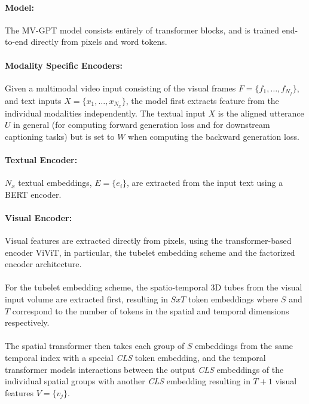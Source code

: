 \documentclass{article}
\begin{document}
\paragraph{Model:} The MV-GPT model consists entirely of transformer blocks, and is trained
end-to-end directly from pixels and word tokens.

\paragraph{Modality Specific Encoders:}Given a multimodal video input consisting of the visual frames $F = \{f_1, \ldots, f_{N_f}\}$,
and text inputs $X = \{x_1, \ldots, x_{N_x}\}$, the model first extracts feature from the individual
modalities independently. The textual input $X$ is the aligned utterance $U$ in general (for computing
forward generation loss and for downstream captioning tasks) but is set to $W$ when computing the
backward generation loss.
\paragraph{Textual Encoder:}$N_x$ textual embeddings, $E = \{e_i\}$, are extracted from the input
text using a BERT encoder.
\paragraph{Visual Encoder:}Visual features are extracted directly from pixels, using the transformer-based
encoder ViViT, in particular, the tubelet embedding scheme and the factorized encoder architecture.

\paragraph{}For the tubelet embedding scheme, the spatio-temporal 3D tubes from the visual 
input volume are extracted first, resulting in $S x T$ token embeddings where $S$ and $T$ correspond to 
the number of tokens in the spatial and temporal dimensions respectively.

\paragraph{}The spatial transformer then takes each group of $S$ embeddings from the same temporal
index with a special \emph{CLS} token embedding, and the temporal transformer models interactions
between the output \emph{CLS} embeddings of the individual spatial groups with another \emph{CLS}
embedding resulting in $T+1$ visual features $V = \{v_j\}$.
\end{document}
